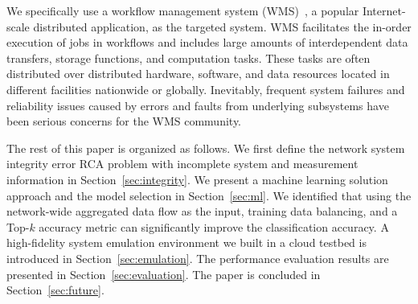 We specifically use a workflow management system (WMS)~\cite{deelman-fgcs-2015}, a popular Internet-scale distributed application, as the targeted system. 
WMS facilitates the in-order execution of jobs in workflows and includes large amounts of interdependent
  data transfers, storage functions, and computation tasks. These tasks are often distributed over distributed hardware, software, and data resources 
  located in different facilities nationwide or globally. Inevitably, frequent system failures and reliability issues 
caused by errors and faults from underlying subsystems have been serious concerns for the WMS community. 

The rest of this paper is organized as follows. We first define the network system integrity error RCA problem with incomplete system and measurement information in Section~\ref{sec:integrity}. 
We present a machine learning solution approach and the model selection in Section~\ref{sec:ml}. We identified that using the network-wide aggregated data flow as the input, training data balancing, 
and a Top-$k$ accuracy metric can significantly improve the classification accuracy.  A high-fidelity system emulation environment we built in a cloud testbed is introduced in Section~\ref{sec:emulation}. 
The performance evaluation results are presented in Section~\ref{sec:evaluation}. The paper is concluded in Section~\ref{sec:future}.

